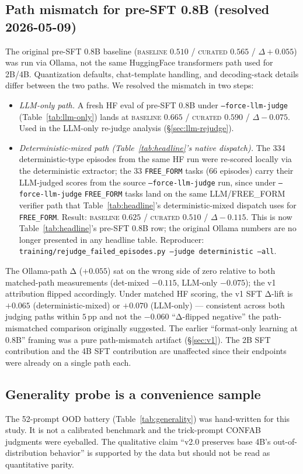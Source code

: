 \documentclass[10pt]{article}
\newcommand{\BL}{\textsc{baseline}\xspace}
\newcommand{\CU}{\textsc{curated}\xspace}
\begin{document}
\subsection{Path mismatch for pre-SFT 0.8B (resolved 2026-05-09)}\label{sec:path-mismatch}
The original pre-SFT 0.8B baseline (\BL{} $0.510$ / \CU{} $0.565$ / $\Delta +0.055$) was run via Ollama, not the same HuggingFace transformers path used for 2B/4B. Quantization defaults, chat-template handling, and decoding-stack details differ between the two paths. We resolved the mismatch in two steps:
\begin{itemize}[leftmargin=*, nosep]
  \item \emph{LLM-only path.} A fresh HF eval of pre-SFT 0.8B under \texttt{--force-llm-judge} (Table~\ref{tab:llm-only}) lands at \BL{} $0.665$ / \CU{} $0.590$ / $\Delta -0.075$. Used in the LLM-only re-judge analysis (\S\ref{sec:llm-rejudge}).
  \item \emph{Deterministic-mixed path (Table~\ref{tab:headline}'s native dispatch).} The 334 deterministic-type episodes from the same HF run were re-scored locally via the deterministic extractor; the 33 \texttt{FREE\_FORM} tasks (66 episodes) carry their LLM-judged scores from the source \texttt{--force-llm-judge} run, since under \texttt{--force-llm-judge} \texttt{FREE\_FORM} tasks land on the same LLM/FREE\_FORM verifier path that Table~\ref{tab:headline}'s deterministic-mixed dispatch uses for \texttt{FREE\_FORM}. Result: \BL{} $0.625$ / \CU{} $0.510$ / $\Delta -0.115$. This is now Table~\ref{tab:headline}'s pre-SFT 0.8B row; the original Ollama numbers are no longer presented in any headline table. Reproducer: \texttt{training/rejudge\_failed\_episodes.py --judge deterministic --all}.
\end{itemize}

The Ollama-path Δ ($+0.055$) sat on the wrong side of zero relative to both matched-path measurements (det-mixed $-0.115$, LLM-only $-0.075$); the v1 attribution flipped accordingly. Under matched HF scoring, the v1 SFT Δ-lift is $+0.065$ (deterministic-mixed) or $+0.070$ (LLM-only) --- consistent across both judging paths within $5$\,pp and not the $-0.060$ ``Δ-flipped negative'' the path-mismatched comparison originally suggested. The earlier ``format-only learning at 0.8B'' framing was a pure path-mismatch artifact (\S\ref{sec:v1}). The 2B SFT contribution and the 4B SFT contribution are unaffected since their endpoints were already on a single path each.

\subsection{Generality probe is a convenience sample}
The 52-prompt OOD battery (Table~\ref{tab:generality}) was hand-written for this study. It is not a calibrated benchmark and the trick-prompt CONFAB judgments were eyeballed. The qualitative claim ``v2.0 preserves base 4B's out-of-distribution behavior'' is supported by the data but should not be read as quantitative parity.
\end{document}

